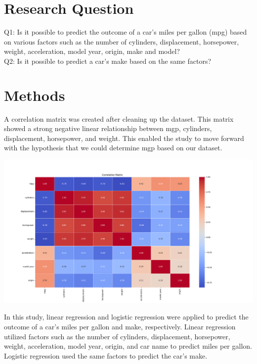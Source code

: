\documentclass[a4paper, twocolumn]{article}
\begin{document}

\section{Research Question\label{sec:Research Question}}
Q1: Is it possible to predict the outcome of a car's miles per gallon (mpg) based on various factors such as the number of cylinders, displacement, horsepower, weight, acceleration, model year, origin, make and model?\\
Q2: Is it possible to predict a car's make based on the same factors?


\section{Methods\label{sec:Methods}}

A correlation matrix was created after cleaning up the dataset. This matrix showed a strong negative linear relationship between mgp, cylinders, displacement, horsepower, and weight. This enabled the study to move forward with the hypothesis that we could determine mgp based on our dataset. 

\includegraphics[width=0.9\linewidth]{images/Correlation.png}


In this study, linear regression and logistic regression were applied to predict the outcome of a car's miles per gallon and make, respectively. Linear regression utilized factors such as the number of cylinders, displacement, horsepower, weight, acceleration, model year, origin, and car name to predict miles per gallon. Logistic regression used the same factors to predict the car's make.
\end{document}
